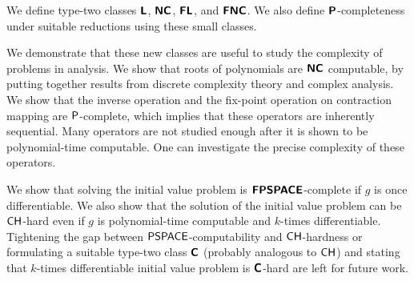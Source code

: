We define type-two classes $\text{\bfseries \sffamily \upshape L}$, $\text{\bfseries \sffamily \upshape NC}$, $\text{\bfseries \sffamily \upshape FL}$,
and $\text{\bfseries \sffamily \upshape FNC}$.
We also define $\text{\bfseries \sffamily \upshape P}$-completeness 
under suitable reductions using these small classes.


We demonstrate that these new classes are useful to study the complexity 
of problems in analysis.
We show that roots of polynomials are $\text{\bfseries \sffamily \upshape NC}$ computable,
by putting together results from discrete complexity theory and
 complex analysis.
We show that the inverse operation and the fix-point operation on contraction mapping are $\mathsf{P}$-complete, which implies that these operators are inherently sequential.
Many operators are not studied enough after it is shown to be polynomial-time
computable.
One can investigate the precise complexity of these operators.


We show that solving the initial value problem is $\text{\bfseries \sffamily \upshape FPSPACE}$-complete
if $g$ is once differentiable.
We also show that the solution of the initial value problem can be $\mathsf{CH}$-hard 
even if $g$ is polynomial-time computable and $k$-times differentiable.
Tightening the gap between $\mathsf{PSPACE}$-computability and $\mathsf{CH}$-hardness 
or formulating a suitable type-two class $\text{\bfseries \sffamily \upshape C}$ 
(probably analogous to $\mathsf{CH}$) and stating that $k$-times differentiable 
initial value problem is $\text{\bfseries \sffamily \upshape C}$-hard are left for future work.

